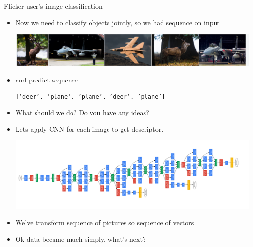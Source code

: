 \documentclass{beamer}
\begin{document}
\begin{frame}{Flicker user's image classification }
	
	\begin{itemize}
			 \item Now we need to classify objects jointly, so we had sequence on input
			\begin{center}
				\includegraphics[scale=0.27]{./img/fl5}
			\end{center}
			
			 \item and predict sequence
			\begin{center}
				\texttt{['deer', 'plane',  'plane', 'deer',  'plane']}
			\end{center}
			 \item What should we do? Do you have any ideas? 
			 \item Lets apply CNN for each image to get descriptor.
			 \begin{center}
				\includegraphics[scale=0.27]{./img/gln}
			\end{center}
			 \item We've transform sequence of pictures so sequence of vectors
			 \item Ok data became much simply, what's next?
	\end{itemize}	
\end{frame}
\end{document}
